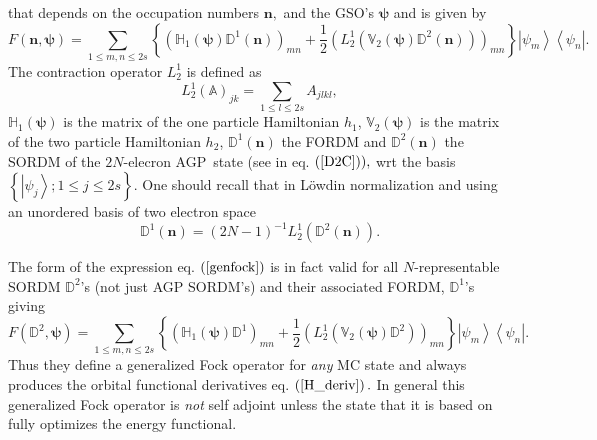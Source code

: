 \documentclass[aps,preprint]{revtex4}%
\begin{document}
that depends on the occupation numbers $\bm{n,}$ and the GSO's $\bm{\psi}$ and
is given by
\begin{equation}
F\left(  \bm{n,\psi}\right)  =\sum_{1\leq m,n\leq2s}\left\{  \left(
\mathbb{H}_{1}\left(  \bm{\psi}\right)  \mathbb{D}^{1}\left(  \bm{n}\right)
\right)  _{mn}+\frac{1}{2}\left(  L_{2}^{1}\left(  \mathbb{V}_{2}\left(
\bm{\psi}\right)  \mathbb{D}^{2}\left(  \bm{n}\right)  \right)  \right)
_{mn}\right\}  \left\vert \psi_{m}\right\rangle \left\langle \psi
_{n}\right\vert . \label{genfock}%
\end{equation}
The contraction operator $L_{2}^{1}$ is defined as
\begin{equation}
L_{2}^{1}\left(  \mathbb{A}\right)  _{jk}=\sum_{1\leq l\leq2s}A_{jlkl},
\end{equation}
$\mathbb{H}_{1}\left(  \bm{\psi}\right)  $ is the matrix of the one particle
Hamiltonian $h_{1}$, $\mathbb{V}_{2}\left(  \bm{\psi}\right)  $ is the matrix
of the two particle Hamiltonian $h_{2}$, $\mathbb{D}^{1}\left(  \bm{n}\right)
$ the FORDM and $\mathbb{D}^{2}\left(  \bm{n}\right)  $ the SORDM of the
$2N$-elecron AGP\ state (see in eq. $\left(  \ref{D2C}\right)  ),$ wrt the
basis $\left\{  \left\vert \psi_{j}\right\rangle ;1\leq j\leq2s\right\}  .$
One should recall that in L\"{o}wdin normalization and using an unordered
basis of two electron space
\begin{equation}
\mathbb{D}^{1}\left(  \bm{n}\right)  =\left(  2N-1\right)  ^{-1}L_{2}%
^{1}\left(  \mathbb{D}^{2}\left(  \bm{n}\right)  \right)  .
\end{equation}


The form of the expression eq. $\left(  \ref{genfock}\right)  $ is in fact
valid for all $N$-representable SORDM $\mathbb{D}^{2}$'s (not just AGP
SORDM's) and their associated FORDM, $\mathbb{D}^{1}$'s giving
\begin{equation}
F\left(  \mathbb{D}^{2}\bm{,\psi}\right)  =\sum_{1\leq m,n\leq2s}\left\{
\left(  \mathbb{H}_{1}\left(  \bm{\psi}\right)  \mathbb{D}^{1}\right)
_{mn}+\frac{1}{2}\left(  L_{2}^{1}\left(  \mathbb{V}_{2}\left(
\bm{\psi }\right)  \mathbb{D}^{2}\right)  \right)  _{mn}\right\}  \left\vert
\psi_{m}\right\rangle \left\langle \psi_{n}\right\vert .
\end{equation}
Thus they define a generalized Fock operator for \emph{any }MC state and
always produces the orbital functional derivatives eq. $\left(  \ref{H_deriv}%
\right)  .$ In general this generalized Fock operator is \emph{not }self
adjoint\emph{ }unless the state that it is based on fully optimizes the energy functional.
\end{document}
